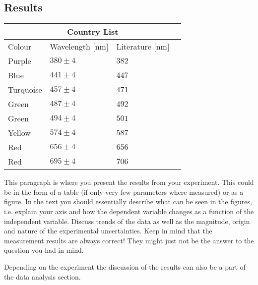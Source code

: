 \subsection{Results}

\begin{tabular}{ |p{3cm}||p{3cm}|p{3cm}|p{3cm}|  }
	\hline
	\multicolumn{4}{|c|}{Country List} \\
	\hline
	Colour& Wavelength [nm] & Literature [nm] &\\
	\hline
	Purple  &$380 \pm 4$	& $382$ &\\
	Blue	&$441 \pm 4$	& $447$ &\\
	Turquoise &$457 \pm 4$	& $471$ &\\
	Green   &$487 \pm 4$ & $492$ &\\
	Green	& $494 \pm 4$  & $501$ &\\
	Yellow& $574 \pm 4$  &  $587$&\\
	Red& $656 \pm 4$  & $656$&\\
	Red& $695 \pm 4$  & $706$&\\
	\hline
\end{tabular}


This paragraph is where you present the results from your
experiment. This could be in the form of a table (if only very few
parameters where measured) or as a figure. In the text you should
essentially describe what can be seen in the figures, i.e. explain
your axis and how the dependent variable changes as a function of
the independent variable. Discuss trends of the data as well as the
magnitude, origin and nature of the experimental uncertainties. Keep
in mind that the measurement results are always correct! They might
just not be the answer to the question you had in mind.

Depending on the experiment the discussion of the results can
also be a part of the data analysis section.